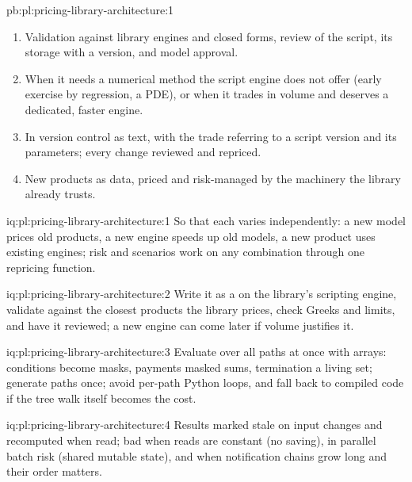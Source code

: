 \begin{solution}{pb:pl:pricing-library-architecture:1}
\begin{enumerate}
engine on common random numbers (0.00 standard errors apart); the compiled script runs 22 to 37 times faster than the interpreted one.
\item Validation against library engines and closed forms, review of the script, its storage with a version, and model approval.
\item When it needs a numerical method the script engine does not offer (early exercise by regression, a PDE), or when it trades in volume
and deserves a dedicated, faster engine.
\item In version control as text, with the trade referring to a script version and its parameters; every change reviewed and repriced.
\item New products as data, priced and risk-managed by the machinery the library already trusts.
\end{enumerate}
\end{solution}

\begin{solution}{iq:pl:pricing-library-architecture:1}
So that each varies independently: a new model prices old products, a new engine speeds up old models, a new product uses existing engines;
risk and scenarios work on any combination through one repricing function.
\end{solution}

\begin{solution}{iq:pl:pricing-library-architecture:2}
Write it as a  on the library's scripting engine, validate against the closest products the library prices, check Greeks and
limits, and have it reviewed; a new engine can come later if volume justifies it.
\end{solution}

\begin{solution}{iq:pl:pricing-library-architecture:3}
Evaluate over all paths at once with arrays: conditions become masks, payments masked sums, termination a living set; generate paths once;
avoid per-path Python loops, and fall back to compiled code if the tree walk itself becomes the cost.
\end{solution}

\begin{solution}{iq:pl:pricing-library-architecture:4}
Results marked stale on input changes and recomputed when read; bad when reads are constant (no saving), in parallel batch risk (shared
mutable state), and when notification chains grow long and their order matters.
\end{solution}

